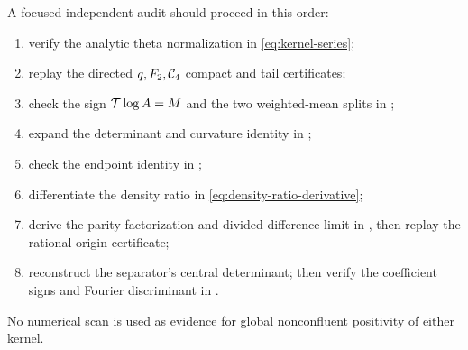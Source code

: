 A focused independent audit should proceed in this order:
\begin{enumerate}
 \item verify the analytic theta normalization in \eqref{eq:kernel-series};
 \item replay the directed \(q,F_2,\mathcal{C}_4\) compact and tail certificates;
 \item check the sign \(\mathcal{T}\log A=M\) and the two weighted-mean splits in
       ;
 \item expand the determinant and curvature identity in
       ;
 \item check the endpoint identity in ;
 \item differentiate the density ratio in
       \eqref{eq:density-ratio-derivative};
 \item derive the parity factorization and divided-difference limit in
       , then replay the rational origin certificate;
 \item reconstruct the separator's central determinant; then verify the
       coefficient signs and Fourier discriminant in .
\end{enumerate}
No numerical scan is used as evidence for global nonconfluent positivity of
either kernel.
